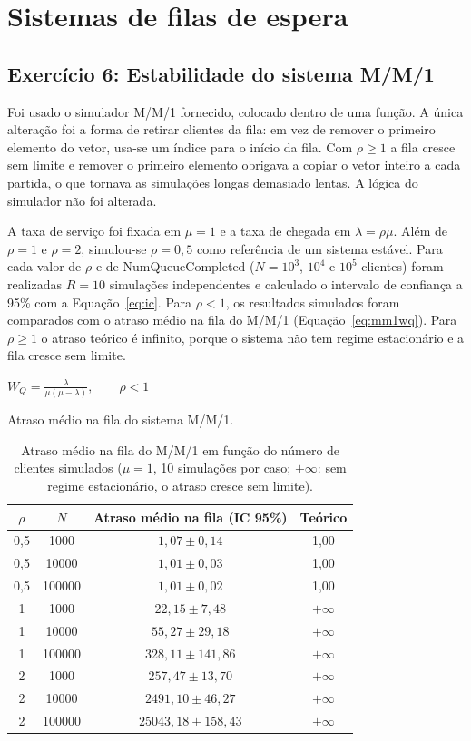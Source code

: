 \documentclass[10pt,a4paper]{article}
\newcommand{\formula}[3]{\begin{equacao}[H]\centering$\displaystyle #1$\caption{#2}\label{#3}\end{equacao}}
\begin{document}
\section{Sistemas de filas de espera}

\subsection{Exercício 6: Estabilidade do sistema M/M/1}

Foi usado o simulador M/M/1 fornecido, colocado dentro de uma função. A única alteração foi a forma de retirar clientes da fila: em vez de remover o primeiro elemento do vetor, usa-se um índice para o início da fila. Com $\rho\geq1$ a fila cresce sem limite e remover o primeiro elemento obrigava a copiar o vetor inteiro a cada partida, o que tornava as simulações longas demasiado lentas. A lógica do simulador não foi alterada.

A taxa de serviço foi fixada em $\mu=1$ e a taxa de chegada em $\lambda=\rho\mu$. Além de $\rho=1$ e $\rho=2$, simulou-se $\rho=0{,}5$ como referência de um sistema estável. Para cada valor de $\rho$ e de NumQueueCompleted ($N=10^3$, $10^4$ e $10^5$ clientes) foram realizadas $R=10$ simulações independentes e calculado o intervalo de confiança a 95\% com a Equação~\ref{eq:ic}. Para $\rho<1$, os resultados simulados foram comparados com o atraso médio na fila do M/M/1 (Equação~\ref{eq:mm1wq}). Para $\rho\geq1$ o atraso teórico é infinito, porque o sistema não tem regime estacionário e a fila cresce sem limite.

\formula{W_Q=\frac{\lambda}{\mu(\mu-\lambda)},\qquad \rho<1}{Atraso médio na fila do sistema M/M/1.}{eq:mm1wq}

\begin{table}[H]
\centering
\begin{tabular}{cS[table-format=6.0]cc}
\toprule
{$\rho$} & {$N$} & {Atraso médio na fila (IC 95\%)} & {Teórico}\\
,5 & 1000   & $1{,}07\pm0{,}14$ & 1,00\\
0,5 & 10000  & $1{,}01\pm0{,}03$ & 1,00\\
0,5 & 100000 & $1{,}01\pm0{,}02$ & 1,00\\
 & 1000   & $22{,}15\pm7{,}48$ & $+\infty$\\
1 & 10000  & $55{,}27\pm29{,}18$ & $+\infty$\\
1 & 100000 & $328{,}11\pm141{,}86$ & $+\infty$\\
 & 1000   & $257{,}47\pm13{,}70$ & $+\infty$\\
2 & 10000  & $2491{,}10\pm46{,}27$ & $+\infty$\\
2 & 100000 & $25043{,}18\pm158{,}43$ & $+\infty$\\
\bottomrule
\end{tabular}
\caption{Atraso médio na fila do M/M/1 em função do número de clientes simulados ($\mu=1$, 10 simulações por caso; $+\infty$: sem regime estacionário, o atraso cresce sem limite).}
\label{tab:ex06}
\end{table}
\end{document}
